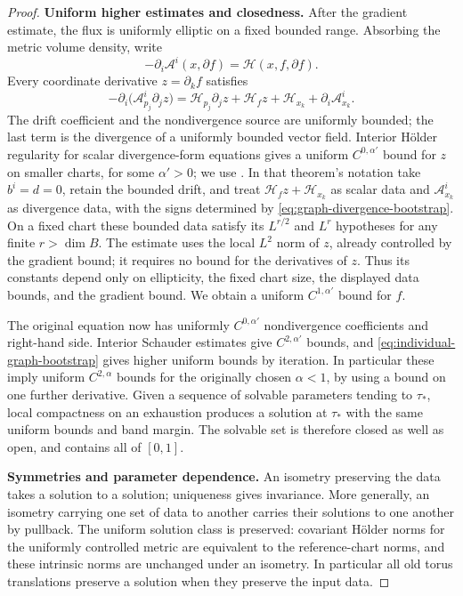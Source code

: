 \begin{proof}
\smallskip\noindent\textbf{Uniform higher estimates and closedness.}
After the gradient estimate, the flux is uniformly elliptic on a fixed bounded range. Absorbing the metric volume density, write
\[
 -\partial_i\mathcal A^i(x,\partial f)
       =\mathcal H(x,f,\partial f).
\]
Every coordinate derivative $z=\partial_k f$ satisfies
\begin{equation}\label{eq:graph-divergence-bootstrap}
 -\partial_i\bigl(\mathcal A^i_{p_j}\partial_jz\bigr)
  =\mathcal H_{p_j}\partial_jz+\mathcal H_f z+\mathcal H_{x_k}
       +\partial_i\mathcal A^i_{x_k}.
\end{equation}
The drift coefficient and the nondivergence source are uniformly bounded;
the last term is the divergence of a uniformly bounded vector field.
Interior H\"older regularity for scalar divergence-form equations gives a
uniform $C^{0,\alpha'}$ bound for $z$ on smaller charts, for some
$\alpha'>0$; we use \cite[Theorem~8.24]{GilbargTrudinger2001}. In that
theorem's notation take $b^i=d=0$, retain the bounded drift, and treat
$\mathcal H_fz+\mathcal H_{x_k}$ as scalar data and $\mathcal A^i_{x_k}$ as
divergence data, with the signs determined by
\eqref{eq:graph-divergence-bootstrap}. On a fixed chart these bounded data
satisfy its $L^{r/2}$ and $L^r$ hypotheses for any finite $r>\dim B$.
The estimate uses the local $L^2$ norm of $z$, already controlled by the
gradient bound; it requires no bound for the derivatives of $z$. Thus its
constants depend only on ellipticity, the fixed chart size, the displayed
data bounds, and the gradient bound. We obtain a uniform
$C^{1,\alpha'}$ bound for $f$.

The original equation now has uniformly $C^{0,\alpha'}$ nondivergence coefficients and right-hand side. Interior Schauder estimates give $C^{2,\alpha'}$ bounds, and \eqref{eq:individual-graph-bootstrap} gives higher uniform bounds by iteration. In particular these imply uniform $C^{2,\alpha}$ bounds for the originally chosen $\alpha<1$, by using a bound on one further derivative. Given a sequence of solvable parameters tending to $\tau_*$, local compactness on an exhaustion produces a solution at $\tau_*$ with the same uniform bounds and band margin. The solvable set is therefore closed as well as open, and contains all of $[0,1]$.

\smallskip\noindent\textbf{Symmetries and parameter dependence.}
An isometry preserving the data takes a solution to a solution; uniqueness
gives invariance. More generally, an isometry carrying one set of data to
another carries their solutions to one another by pullback. The uniform
solution class is preserved: covariant H\"older norms for the uniformly
controlled metric are equivalent to the reference-chart norms, and these
intrinsic norms are unchanged under an isometry. In particular all old torus translations preserve a solution when they preserve the input data.


\end{proof}
